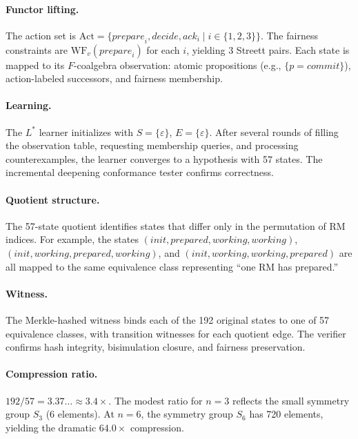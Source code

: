 \documentclass[11pt]{article}
\newcommand{\Act}{\ensuremath{\mathrm{Act}}}
\newcommand{\WF}{\ensuremath{\mathrm{WF}}}
\begin{document}
\paragraph{Functor lifting.}
The action set is
$\Act = \{\mathit{prepare}_i, \mathit{decide}, \mathit{ack}_i \mid
i \in \{1,2,3\}\}$.
The fairness constraints are $\WF_v(\mathit{prepare}_i)$ for each $i$,
yielding 3 Streett pairs.
Each state is mapped to its $F$-coalgebra observation:
atomic propositions (e.g., $\{p = commit\}$), action-labeled successors,
and fairness membership.

\paragraph{Learning.}
The $L^*$ learner initializes with $S = \{\varepsilon\}$,
$E = \{\varepsilon\}$.
After several rounds of filling the observation table, requesting
membership queries, and processing counterexamples, the learner converges
to a hypothesis with 57 states.
The incremental deepening conformance tester confirms correctness.

\paragraph{Quotient structure.}
The 57-state quotient identifies states that differ only in the
permutation of RM indices.
For example, the states $(init, prepared, working, working)$,
$(init, working, prepared, working)$, and
$(init, working, working, prepared)$ are all mapped to the same
equivalence class representing ``one RM has prepared.''

\paragraph{Witness.}
The Merkle-hashed witness binds each of the 192 original states to one of
57 equivalence classes, with transition witnesses for each quotient edge.
The verifier confirms hash integrity, bisimulation closure, and fairness
preservation.

\paragraph{Compression ratio.}
$192 / 57 = 3.37\ldots \approx 3.4\times$.
The modest ratio for $n = 3$ reflects the small symmetry group $S_3$
(6 elements).
At $n = 6$, the symmetry group $S_6$ has 720 elements, yielding the
dramatic $64.0\times$ compression.


\end{document}
